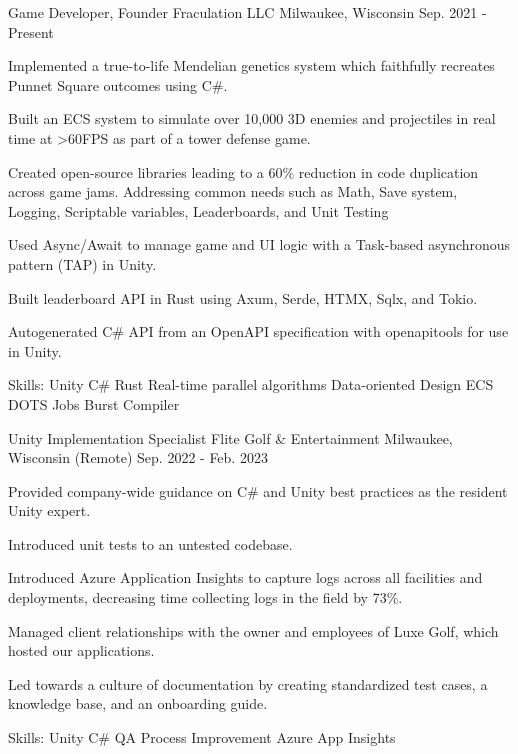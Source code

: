 \begin{cventries}
  \cventry
    {Game Developer, Founder} %
    {Fraculation LLC} %
    {Milwaukee, Wisconsin} %
    {Sep. 2021 - Present} %
    {
      \begin{cvitems} %
        \item {Implemented a true-to-life Mendelian genetics system which faithfully recreates Punnet Square outcomes using C\#.}
        \item {Built an ECS system to simulate over 10,000 3D enemies and projectiles in real time at >60FPS as part of a tower defense game.}
        \item {Created open-source libraries leading to a 60\% reduction in code duplication across game jams. Addressing common needs such as Math, Save system, Logging, Scriptable variables, Leaderboards, and Unit Testing}
        \item {Used Async/Await to manage game and UI logic with a Task-based asynchronous pattern (TAP) in Unity.}
        \item {Built leaderboard API in Rust using Axum, Serde, HTMX, Sqlx, and Tokio.}
        \item {Autogenerated C\# API from an OpenAPI specification with openapitools for use in Unity.}
        \item {Skills: Unity \textbullet{} C\# \textbullet{} Rust \textbullet{} Real-time parallel algorithms \textbullet{} Data-oriented Design \textbullet{} ECS \textbullet{} DOTS \textbullet{} Jobs \textbullet{} Burst Compiler}
      \end{cvitems}
    }

  \cventry
    {Unity Implementation Specialist} %
    {Flite Golf \& Entertainment} %
    {Milwaukee, Wisconsin (Remote)} %
    {Sep. 2022 - Feb. 2023} %
    {
      \begin{cvitems} %
        \item {Provided company-wide guidance on C\# and Unity best practices as the resident Unity expert.}
        \item {Introduced unit tests to an untested codebase.}
        \item {Introduced Azure Application Insights to capture logs across all facilities and deployments, decreasing time collecting logs in the field by 73\%.}
        \item {Managed client relationships with the owner and employees of Luxe Golf, which hosted our applications.}
        \item {Led towards a culture of documentation by creating standardized test cases, a knowledge base, and an onboarding guide.}
        \item {Skills: Unity \textbullet{} C\# \textbullet{} QA Process Improvement \textbullet{} Azure App Insights}
      \end{cvitems}
    }


\end{cventries}
